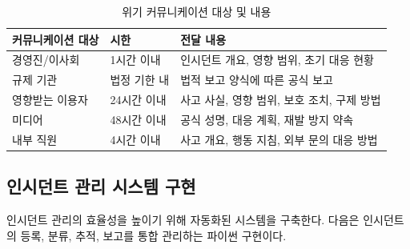 \begin{table}[htbp]
\centering
\caption{위기 커뮤니케이션 대상 및 내용}
\label{tab:crisis_communication}
\begin{tabularx}{\textwidth}{p{2.5cm}p{2cm}X}
\toprule
\textbf{커뮤니케이션 대상} & \textbf{시한} & \textbf{전달 내용} \\
\midrule
경영진/이사회 & 1시간 이내 & 인시던트 개요, 영향 범위, 초기 대응 현황 \\
규제 기관 & 법정 기한 내 & 법적 보고 양식에 따른 공식 보고 \\
영향받는 이용자 & 24시간 이내 & 사고 사실, 영향 범위, 보호 조치, 구제 방법 \\
미디어 & 48시간 이내 & 공식 성명, 대응 계획, 재발 방지 약속 \\
내부 직원 & 4시간 이내 & 사고 개요, 행동 지침, 외부 문의 대응 방법 \\
\bottomrule
\end{tabularx}
\end{table}

\subsection{인시던트 관리 시스템 구현}
\label{sec:5.6.5}

인시던트 관리의 효율성을 높이기 위해 자동화된 시스템을 구축한다. 다음은 인시던트의 등록, 분류, 추적, 보고를 통합 관리하는 파이썬 구현이다.

